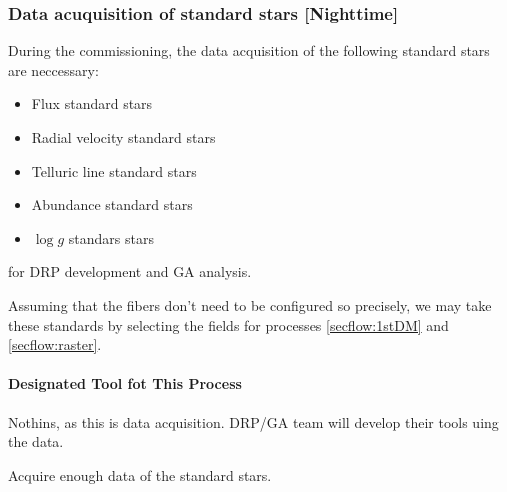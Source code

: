 \subsubsection{Data acuquisition of standard stars [Nighttime]}\label{secflow:StdStar}


During the commissioning, the data acquisition of the following standard stars are neccessary:
\begin{itemize}
    \item Flux standard stars
    \item Radial velocity standard stars
    \item Telluric line standard stars
    \item Abundance standard stars
    \item $\log g$ standars stars
\end{itemize}
for DRP development and GA analysis.

Assuming that the fibers don't need to be configured so precisely, we may take these standards by selecting the fields for processes \ref{secflow:1stDM} and \ref{secflow:raster}.


\paragraph{Designated Tool fot This Process}
Nothins, as this is data acquisition.
DRP/GA team will develop their tools uing the data.

\begin{itembox}[l]{}
Acquire enough data of the standard stars.

\end{itembox}